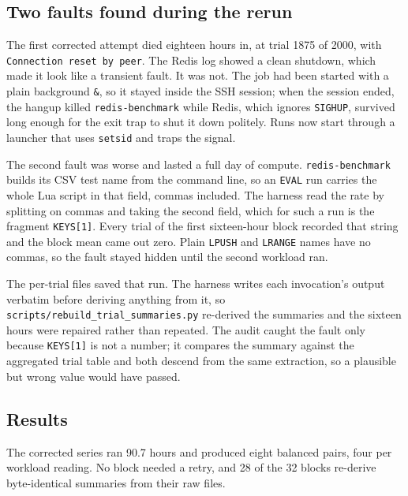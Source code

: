 \documentclass[a4paper,11pt]{article}
\begin{document}
\subsection{Two faults found during the rerun}

The first corrected attempt died eighteen hours in, at trial 1875 of 2000, with
\texttt{Connection reset by peer}. The Redis log showed a clean shutdown, which
made it look like a transient fault. It was not. The job had been started with a
plain background \texttt{\&}, so it stayed inside the SSH session; when the
session ended, the hangup killed \texttt{redis-benchmark} while Redis, which
ignores \texttt{SIGHUP}, survived long enough for the exit trap to shut it down
politely. Runs now start through a launcher that uses \texttt{setsid} and traps
the signal.

The second fault was worse and lasted a full day of compute.
\texttt{redis-benchmark} builds its CSV test name from the command line, so an
\texttt{EVAL} run carries the whole Lua script in that field, commas included.
The harness read the rate by splitting on commas and taking the second field,
which for such a run is the fragment \texttt{KEYS[1]}. Every trial of the first
sixteen-hour block recorded that string and the block mean came out zero. Plain
\texttt{LPUSH} and \texttt{LRANGE} names have no commas, so the fault stayed
hidden until the second workload ran.

The per-trial files saved that run. The harness writes each invocation's output
verbatim before deriving anything from it, so
\texttt{scripts/rebuild\_trial\_summaries.py} re-derived the summaries and the
sixteen hours were repaired rather than repeated. The audit caught the fault only
because \texttt{KEYS[1]} is not a number; it compares the summary against the
aggregated trial table and both descend from the same extraction, so a plausible
but wrong value would have passed.

\subsection{Results}

The corrected series ran 90.7 hours and produced eight balanced pairs, four per
workload reading. No block needed a retry, and 28 of the 32 blocks re-derive
byte-identical summaries from their raw files.
\end{document}
